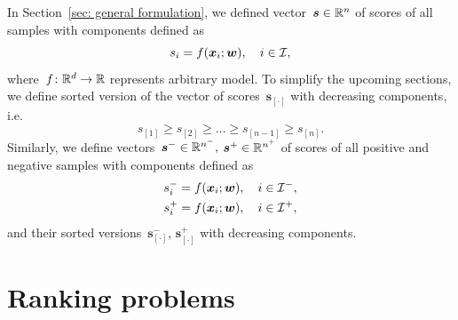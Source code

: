 \begin{notation}\label{not: scores}
  In Section~\ref{sec: general formulation}, we defined vector~$\bm{s} \in \mathbb{R}^n$ of scores of all samples with components defined as
  \begin{equation*}
    s_i = f(\bm{x}_i; \bm{w}), \quad i \in \mathcal{I},
  \end{equation*}
  where~$f \colon \mathbb{R}^d \to \mathbb{R}$ represents arbitrary model. To simplify the upcoming sections, we define sorted version of the vector of scores~$\bm{s}_{[\cdot]}$ with decreasing components, i.e.
  \begin{equation*}
    s_{[1]}   \ge s_{[2]} \ge \dots \ge s_{[n - 1]} \ge s_{[n]}.
  \end{equation*}
  Similarly, we define vectors~$\bm{s}^- \in \mathbb{R}^{n^-},$ $\bm{s}^+ \in \mathbb{R}^{n^+}$ of scores of all positive and negative samples with components defined as
  \begin{equation*}
    \begin{aligned}
      s^-_i & = f(\bm{x}_i; \bm{w}), \quad i \in \mathcal{I}^-, \\
      s^+_i & = f(\bm{x}_i; \bm{w}), \quad i \in \mathcal{I}^+,
    \end{aligned}
  \end{equation*}
  and their sorted versions~$\bm{s}^-_{[\cdot]}$, $\bm{s}^+_{[\cdot]}$ with decreasing components.
\end{notation}

\section{Ranking problems}\label{sec:obj1}

